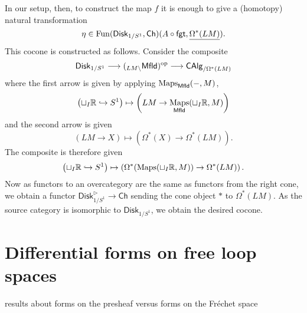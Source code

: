 \documentclass{amsart}
\begin{document}
In our setup, then, to construct the map $f$ it is enough to give a (homotopy) 
natural transformation
\begin{equation*}
    \eta \in \operatorname{Fun}(\mathsf{Disk}_{1/S^1}, \mathsf{Ch})(A\circ\mathsf{fgt}, 
    \underline{\Omega^*(LM)}).
\end{equation*}
This cocone is constructed as follows. Consider the composite
\begin{equation*}
    \mathsf{Disk}_{1/S^1} \longrightarrow ({}_{LM\backslash}\mathsf{Mfld})^{\text{op}}
    \longrightarrow \mathsf{CAlg}_{/\Omega^*(LM)}
\end{equation*}
where the first arrow is given by applying $\operatorname*{Maps}_{\mathsf{Mfld}}(-,M)$,
\begin{equation*}
    \left(\sqcup_I \mathbb{R} \hookrightarrow S^1\right) \mapsto \left(LM \to 
    \operatorname*{Maps}_{\mathsf{Mfld}}(\sqcup_I\mathbb{R}, M)\right)
\end{equation*}
and the second arrow is given
\begin{equation*}
    \left(LM \to X\right) \mapsto \left(\Omega^*(X)\to\Omega^*(LM)\right).
\end{equation*}
The composite is therefore given
\begin{equation*}
    \left(\sqcup_I \mathbb{R}\hookrightarrow S^1\right) \mapsto 
    \left(\Omega^*(\operatorname*{Maps}(\sqcup_I\mathbb{R}, M)) \to \Omega^*(LM)\right).
\end{equation*}
Now as functors to an overcategory are the same as functors from the right cone, 
we obtain a functor $\mathsf{Disk}_{1/S^1}^\triangleright \to \mathsf{Ch}$ 
sending the cone object $\ast$ to $\Omega^*(LM)$. As the source category
is isomorphic to $\mathsf{Disk}_{1/S^1}$, we obtain the desired 
cocone.

\appendix

\section{Differential forms on free loop spaces}

results about forms on the presheaf versus forms on the Fr\'echet space
\end{document}
